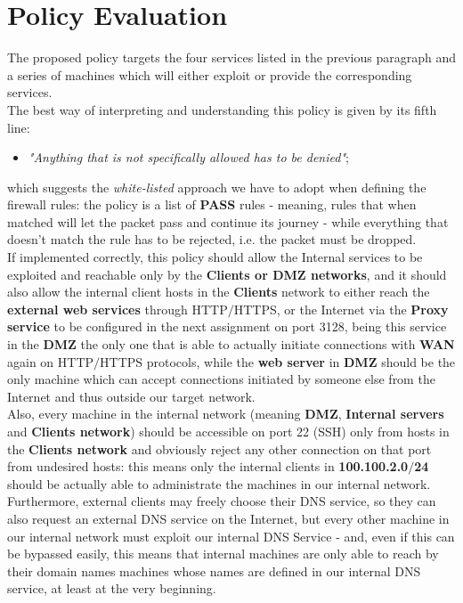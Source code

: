 \section{Policy Evaluation}
The proposed policy targets the four services listed in the previous paragraph and a series of machines which will either exploit or provide the corresponding services.\\
The best way of interpreting and understanding this policy is given by its fifth line:\\
\begin{itemize}
\item \textit{"Anything that is not specifically allowed has to be denied"};
\end{itemize}

which suggests the \textit{white-listed} approach we have to adopt when defining the firewall rules: the policy is a list of \textbf{PASS} rules - meaning, rules that when matched will let the packet pass and continue its journey - while everything that doesn't match the rule has to be rejected, i.e. the packet must be dropped.\\
If implemented correctly, this policy should allow the Internal services to be exploited and reachable only by the \textbf{Clients or DMZ networks}, and it should also allow the internal client hosts in the \textbf{Clients} network to either reach the \textbf{external web services} through HTTP$/$HTTPS, or the Internet via the \textbf{Proxy service} to be configured in the next assignment on port 3128, being this service in the \textbf{DMZ} the only one that is able to actually initiate connections with \textbf{WAN} again on HTTP$/$HTTPS protocols, while the \textbf{web server} in \textbf{DMZ} should be the only machine which can accept connections initiated by someone else from the Internet and thus outside our target network.\\
Also, every machine in the internal network (meaning \textbf{DMZ}, \textbf{Internal servers} and \textbf{Clients network}) should be accessible on port 22 (SSH) only from hosts in the \textbf{Clients network} and obviously reject any other connection on that port from undesired hosts: this means only the internal clients in \textbf{100.100.2.0$/$24} should be actually able to administrate the machines in our internal network.\\
Furthermore, external clients may freely choose their DNS service, so they can also request an external DNS service on the Internet, but every other machine in our internal network must exploit our internal DNS Service - and, even if this can be bypassed easily, this means that internal machines are only able to reach by their domain names machines whose names are defined in our internal DNS service, at least at the very beginning.\\
